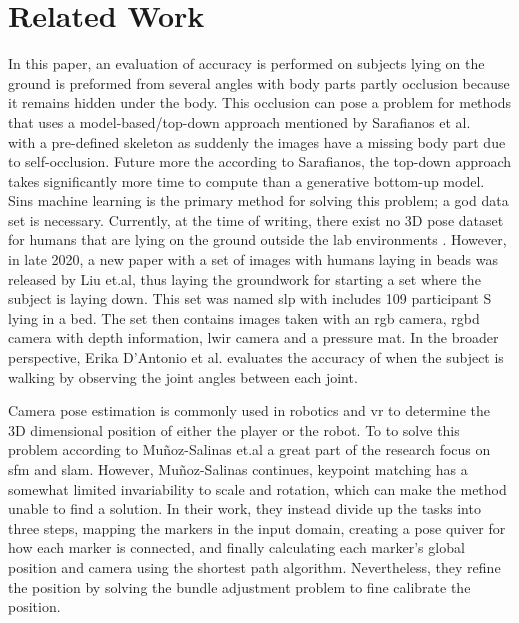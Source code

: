 \section{Related Work}
\label{sec:related_work}
In this paper, an evaluation of accuracy is performed on subjects lying on the ground is preformed from several angles with body parts partly occlusion because it remains hidden under the body.
This occlusion can pose a problem for methods that uses a model-based/top-down approach mentioned by Sarafianos et al. ~\cite{sarafianos2016} with a pre-defined skeleton as suddenly the images have a missing body part due to self-occlusion.
Future more the according to Sarafianos, the top-down approach takes significantly more time to compute than a generative bottom-up model.
Sins machine learning is the primary method for solving this problem; a god data set is necessary.
Currently, at the time of writing, there exist no 3D pose dataset for humans that are lying on the ground outside the lab environments \cite{yang2018, mehta2017, yasin2016, wang2019}.
However, in late 2020, a new paper with a set of images with humans laying in beads was released by Liu et.al\cite{liu2020simultaneously}, thus laying the groundwork for starting a set where the subject is laying down.
This set was named \ac{slp} with includes 109 participant S lying in a bed.
The set then contains images taken with an \ac{rgb} camera, \ac{rgbd} camera with depth information, \ac{lwir} camera and a pressure mat.
In the broader perspective, Erika D’Antonio et al. \cite{d2021validation} evaluates the accuracy of \openpose{ } when the subject is walking by observing the joint angles between each joint.

Camera pose estimation is commonly used in robotics and \ac{vr} to determine the 3D dimensional position of either the player or the robot.
To to solve this problem according to Mu{\~n}oz-Salinas et.al\cite{munoz2018mapping} a great part of the research focus on \ac{sfm} and \ac{slam}.
However, Mu{\~n}oz-Salinas continues, keypoint matching has a somewhat limited invariability to scale and rotation, which can make the method unable to find a solution.
In their work, they instead divide up the tasks into three steps, mapping the markers in the input domain, creating a pose quiver for how each marker is connected, and finally calculating each marker's global position and camera using the shortest path algorithm.
Nevertheless, they refine the position by solving the bundle adjustment problem to fine calibrate the position.


